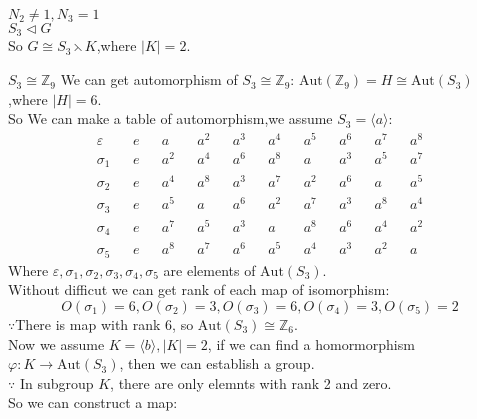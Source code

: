 \documentclass[a4paper,14pt]{article}
\begin{document}
\begin{enumerate}
        \begin{item}{$N_2 \neq 1, N_3 = 1$}\\
            $S_3 \lhd G$\\
            So $G \cong S_3 \leftthreetimes K$,where $|K|=2$.\\
            \begin{enumerate}
                \begin{item}{$S_3 \cong \mathbb{Z}_9$}
                    We can get automorphism of $S_3 \cong \mathbb{Z}_9$: $\text{Aut}(\mathbb{Z}_9) = H \cong \text{Aut}(S_3)$,where $|H| = 6$.\\
                    So We can make a table of automorphism,we assume $S_3=\langle a \rangle$:
                    \begin{align*}
                        \varepsilon && e && a   && a^2 && a^3 && a^4 && a^5 && a^6 && a^7 && a^8\\
                        \sigma_1    && e && a^2 && a^4 && a^6 && a^8 && a   && a^3 && a^5 && a^7\\
                        \sigma_2    && e && a^4 && a^8 && a^3 && a^7 && a^2 && a^6 && a   && a^5\\
                        \sigma_3    && e && a^5 && a   && a^6 && a^2 && a^7 && a^3 && a^8 && a^4\\
                        \sigma_4    && e && a^7 && a^5 && a^3 && a   && a^8 && a^6 && a^4 && a^2\\
                        \sigma_5    && e && a^8 && a^7 && a^6 && a^5 && a^4 && a^3 && a^2 && a
                    \end{align*}
                    Where $\varepsilon,\sigma_1,\sigma_2,\sigma_3,\sigma_4,\sigma_5$ are elements of $\text{Aut}(S_3)$.\\
                    Without difficut we can get rank of each map of isomorphism:
                    \[
                        O(\sigma_1) = 6, O(\sigma_2)=3,O(\sigma_3)=6,O(\sigma_4)=3,O(\sigma_5)=2
                        \]
                    $\because$There is map with rank 6, so $\text{Aut}(S_3)\cong \mathbb{Z}_6$.\\
                    Now we assume $K=\langle b \rangle,|K|=2$, if we can find a homormorphism $\varphi:K \rightarrow \text{Aut}(S_3)$, then we can establish a group.\\
                    $\because$ In subgroup $K$, there are only elemnts with rank 2 and zero.\\
                    So we can construct a map:\\

\end{item}
\end{enumerate}
\end{item}
\end{enumerate}
\end{document}
